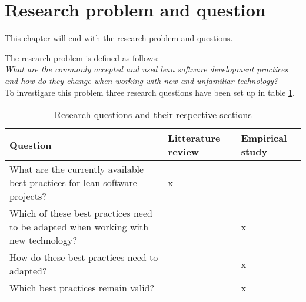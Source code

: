 \section{Research problem and question}
\label{section:problem}

This chapter will end with the research problem and questions.

The research problem is defined as follows:\\

\textit{What are the commonly accepted and used lean software development practices and how do they change when working with new and unfamiliar technology?}\\

To investigare this problem three research questions have been set up in table \ref{tbl:questions}.


\begin{table}
  \begin{tabular}{p{200pt} | p{70pt} | p{70pt}}
    Question & Litterature review & Empirical study \\
    \hline
    What are the currently available best practices for lean software projects? & x & \\
    Which of these best practices need to be adapted when working with new technology? &  & x \\
    How do these best practices need to adapted? &  & x \\
    Which best practices remain valid? &  & x \\
  \end{tabular}
  \caption{Research questions and their respective sections}
  \label{tbl:questions}
\end{table}
